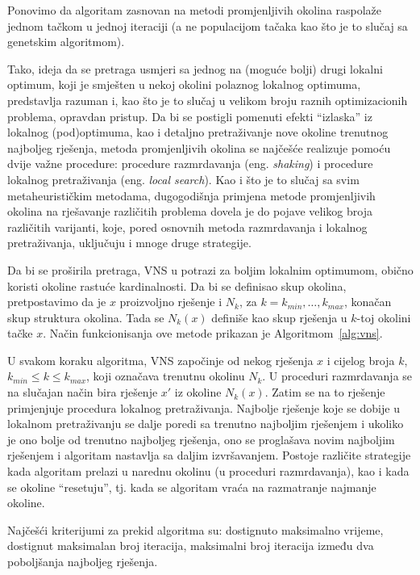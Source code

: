 \documentclass[a4paper, utf8, 11pt, colorlinks]{book}
\begin{document}
Ponovimo da algoritam zasnovan na metodi promjenljivih okolina raspolaže jednom tačkom u jednoj iteraciji (a ne populacijom tačaka kao što je to slučaj sa genetskim algoritmom).

Tako, ideja da se pretraga usmjeri sa jednog na (moguće bolji) drugi lokalni optimum, koji je smješten u nekoj okolini polaznog lokalnog optimuma, predstavlja razuman  i, kao što je to slučaj u velikom broju raznih optimizacionih problema, opravdan pristup.
Da bi se postigli pomenuti efekti ``izlaska'' iz lokalnog (pod)optimuma, kao i detaljno pretraživanje nove okoline trenutnog najboljeg rješenja, metoda promjenljivih okolina se najčešće realizuje pomoću dvije važne procedure: procedure razmrdavanja (eng. \emph{shaking}) i procedure lokalnog pretraživanja (eng. \emph{local search}). Kao i što je to slučaj sa svim metaheurističkim metodama, dugogodišnja primjena metode promjenljivih okolina na rješavanje različitih problema dovela je do pojave velikog broja različitih varijanti, koje, pored osnovnih metoda razmrdavanja i lokalnog pretraživanja, uključuju i mnoge druge strategije.

Da bi se proširila pretraga,  VNS u potrazi za boljim lokalnim optimumom, obično koristi okoline rastuće kardinalnosti. Da bi se definisao skup okolina, pretpostavimo da je $x$ proizvoljno rješenje i $N_k$, za $k=k_{min},\ldots,k_{max}$, konačan skup struktura okolina. Tada se  $N_k(x)$ definiše kao skup rješenja u $k$-toj okolini tačke $x$. 
Način funkcionisanja ove metode prikazan je Algoritmom~\ref{alg:vns}. 


U svakom koraku algoritma, VNS započinje od nekog rješenja $x$ i cijelog broja $k$, $k_{min}\leqslant k\leqslant k_{max}$, koji označava trenutnu okolinu $N_k$. U proceduri razmrdavanja
se na slučajan način bira rješenje  $x'$ iz okoline  $N_k(x)$. Zatim se na to rješenje primjenjuje procedura lokalnog pretraživanja. Najbolje rješenje koje se dobije u lokalnom pretraživanju se dalje poredi sa trenutno najboljim rješenjem i ukoliko je ono bolje od trenutno najboljeg rješenja, ono se proglašava novim najboljim rješenjem i algoritam nastavlja sa daljim izvršavanjem. Postoje različite strategije kada algoritam prelazi u narednu okolinu (u proceduri razmrdavanja), kao i kada se okoline ``resetuju'', tj. kada se algoritam vraća na razmatranje najmanje okoline. 

Najčešći kriterijumi za prekid   algoritma su: dostignuto maksimalno  vrijeme, dostignut maksimalan broj iteracija, maksimalni broj iteracija između dva poboljšanja najboljeg rješenja. %
\end{document}
